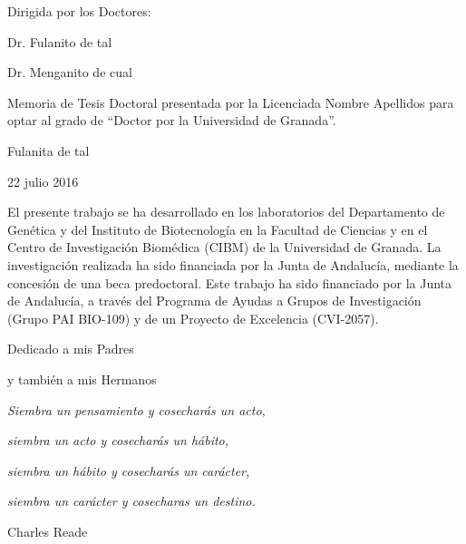 \documentclass[b5paper,twoside,10pt]{book}
\newcommand{\fecha}{22 julio 2016}
\begin{document}
\begin{minipage}[t]{.4\textwidth}
Dirigida por los Doctores:

\vspace{15ex}

Dr. Fulanito de tal

\vspace{15ex}

Dr. Menganito de cual

\end{minipage}
\hfill
\begin{minipage}[t]{.5\textwidth}
Memoria de Tesis Doctoral presentada por la Licenciada Nombre Apellidos  para optar al grado de ``Doctor por la Universidad de Granada''.

\vspace{29.7ex}

\centering 
Fulanita de tal

\fecha

\end{minipage}


\cleardoublepage
\thispagestyle{empty}

\null{}
El presente trabajo se ha desarrollado en los laboratorios del Departamento de Gen\'etica y del Instituto de Biotecnolog\'ia en la Facultad de Ciencias y en el Centro de Investigaci\'on Biom\'edica (CIBM) de la Universidad de Granada. La investigaci\'on realizada ha sido financiada por la Junta de Andalucía, mediante la concesi\'on de una beca predoctoral. Este trabajo ha sido financiado por la Junta de Andalucía, a través del Programa de Ayudas a Grupos de Investigación (Grupo PAI BIO-109) y de un Proyecto de Excelencia (CVI-2057).
 
\cleardoublepage

\cleardoublepage
\null{}
\begin{flushright}
 Dedicado a mis Padres 

y también a mis Hermanos
\end{flushright}
\cleardoublepage




\null{}
{
\hfill \begin{minipage}{8cm}
\textsl{Siembra un pensamiento y cosecharás un acto,}

\textsl{siembra un acto y cosecharás un hábito,}

\textsl{siembra un hábito y cosecharás un carácter,}

\textsl{siembra un carácter y cosecharas un destino. }

\begin{flushright}
Charles Reade  
\end{flushright}

\end{minipage}
}
\cleardoublepage
\end{document}
